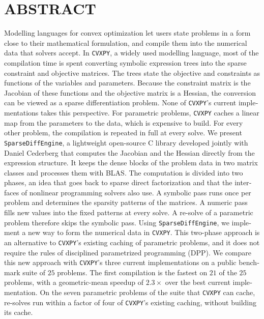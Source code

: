 
\chapter*{ABSTRACT}\thispagestyle{headings}
%
\begin{otherlanguage}{english}

Modelling languages for convex optimization let users state problems in a form close to their
mathematical formulation, and compile them into the numerical data that solvers accept.
In \texttt{CVXPY}, a
widely used modelling language, most of the compilation time is spent converting symbolic
expression trees into the sparse constraint and objective matrices. The trees state the
objective and constraints as functions of the variables and parameters. Because the constraint
matrix is the Jacobian of these functions and the objective matrix is a Hessian, the conversion
can be viewed as a sparse differentiation problem. None of \texttt{CVXPY}'s current
implementations takes this perspective. For
parametric problems, \texttt{CVXPY} caches a linear map from the parameters to the data, which
is expensive to build. For every other problem, the
compilation is repeated in full at every solve.
We present \texttt{SparseDiffEngine}, a lightweight open-source C library
developed jointly with Daniel Cederberg
that computes the Jacobian and the Hessian directly from the expression structure. It keeps the
dense blocks of the problem data in two matrix classes and processes them with BLAS. The
computation
is divided into two phases, an idea that goes back to sparse direct factorization and that
the interfaces of nonlinear programming solvers also use.
A symbolic pass runs once per problem and determines the sparsity patterns of the
matrices. A numeric pass fills new values into the fixed patterns at every solve. A re-solve of a
parametric problem therefore skips the symbolic pass. Using \texttt{SparseDiffEngine}, we
implement a new way to form the numerical data in \texttt{CVXPY}. This two-phase approach is an
alternative to \texttt{CVXPY}'s existing caching of parametric problems, and it does not
require the rules of disciplined parametrized programming (DPP). We compare this new approach with
\texttt{CVXPY}'s three current implementations on a public benchmark suite of $25$ problems. The
first compilation is the fastest on $21$ of the $25$ problems, with a geometric-mean speedup of
$2.3\times$ over the best current implementation. On the seven parametric problems of the suite that
\texttt{CVXPY} can cache,
re-solves run within a factor of four of \texttt{CVXPY}'s existing caching, without building
its cache.

\end{otherlanguage}
